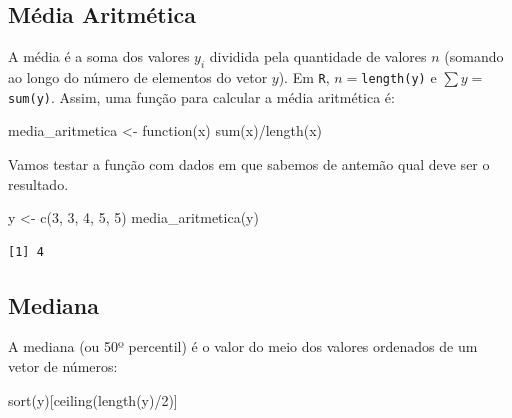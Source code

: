 \documentclass[
  letterpaper,
  DIV=11,
  numbers=noendperiod]{scrreprt}
\newenvironment{Shaded}{\begin{snugshade}}{\end{snugshade}}
\newcommand{\ControlFlowTok}[1]{\textcolor[rgb]{0.00,0.23,0.31}{#1}}
\newcommand{\DecValTok}[1]{\textcolor[rgb]{0.68,0.00,0.00}{#1}}
\newcommand{\FunctionTok}[1]{\textcolor[rgb]{0.28,0.35,0.67}{#1}}
\newcommand{\NormalTok}[1]{\textcolor[rgb]{0.00,0.23,0.31}{#1}}
\newcommand{\OtherTok}[1]{\textcolor[rgb]{0.00,0.23,0.31}{#1}}
\newcommand{\SpecialCharTok}[1]{\textcolor[rgb]{0.37,0.37,0.37}{#1}}
\begin{document}
\subsection{Média Aritmética}\label{muxe9dia-aritmuxe9tica}

A média é a soma dos valores \(y_i\) dividida pela quantidade de valores
\(n\) (somando ao longo do número de elementos do vetor \(y\)). Em
\texttt{R}, \(n =\)\texttt{length(y)} e \(\sum y =\)\texttt{sum(y)}.
Assim, uma função para calcular a média aritmética é:

\begin{Shaded}
\begin{Highlighting}[]
\NormalTok{media\_aritmetica }\OtherTok{\textless{}{-}} \ControlFlowTok{function}\NormalTok{(x) }\FunctionTok{sum}\NormalTok{(x)}\SpecialCharTok{/}\FunctionTok{length}\NormalTok{(x)}
\end{Highlighting}
\end{Shaded}

Vamos testar a função com dados em que sabemos de antemão qual deve ser
o resultado.

\begin{Shaded}
\begin{Highlighting}[]
\NormalTok{y }\OtherTok{\textless{}{-}} \FunctionTok{c}\NormalTok{(}\DecValTok{3}\NormalTok{, }\DecValTok{3}\NormalTok{, }\DecValTok{4}\NormalTok{, }\DecValTok{5}\NormalTok{, }\DecValTok{5}\NormalTok{)}
\FunctionTok{media\_aritmetica}\NormalTok{(y)}
\end{Highlighting}
\end{Shaded}

\begin{verbatim}
[1] 4
\end{verbatim}

\subsection{Mediana}\label{mediana}

A mediana (ou 50º percentil) é o valor do meio dos valores ordenados de
um vetor de números:

\begin{Shaded}
\begin{Highlighting}[]
\FunctionTok{sort}\NormalTok{(y)[}\FunctionTok{ceiling}\NormalTok{(}\FunctionTok{length}\NormalTok{(y)}\SpecialCharTok{/}\DecValTok{2}\NormalTok{)]}
\end{Highlighting}
\end{Shaded}
\end{document}
